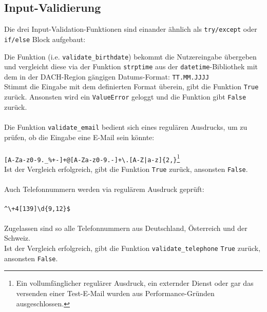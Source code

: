 
        \subsection{Input-Validierung} \label{Implementierung: validation.py}
            Die drei Input-Validation-Funktionen sind einander ähnlich als \verb|try/except| oder \verb|if/else| Block aufgebaut:

            Die Funktion (i.e. \verb|validate_birthdate|) bekommt die Nutzereingabe übergeben und vergleicht diese via der Funktion \verb|strptime| aus der \verb|datetime|-Bibliothek \cite{datetime} mit dem in der DACH-Region gängigen Datums-Format: \verb|TT.MM.JJJJ| \\
            Stimmt die Eingabe mit dem definierten Format überein, gibt die Funktion \verb|True| zurück. Ansonsten wird ein \verb|ValueError| geloggt und die Funktion gibt \verb|False| zurück.\\ 
            \\
            Die Funktion \verb|validate_email| bedient sich eines regulären Ausdrucks, um zu prüfen, ob die Eingabe eine E-Mail sein könnte: \\
            \\
            \verb/[A-Za-z0-9._%+-]+@[A-Za-z0-9.-]+\.[A-Z|a-z]{2,}/\footnote{Ein vollumfänglicher regulärer Ausdruck, ein externder Dienst oder gar das versenden einer Test-E-Mail wurden aus Performance-Gründen ausgeschlossen.} \\ 
            Ist der Vergleich erfolgreich, gibt die Funktion \verb|True| zurück, ansonsten \verb|False|. \\
            \\
            Auch Telefonnummern werden via regulärem Ausdruck geprüft: \\
            \\\verb/^\+4[139]\d{9,12}$/ \\
            \\
            Zugelassen sind so alle Telefonnummern aus Deutschland, Österreich und der Schweiz.\\
            Ist der Vergleich erfolgreich, gibt die Funktion \verb|validate_telephone| \verb|True| zurück, ansonsten \verb|False|.

